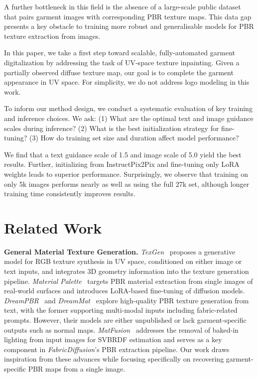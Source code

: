 \documentclass[11pt,twocolumn]{article}
\begin{document}
A further bottleneck in this field is the absence of a large-scale public dataset that pairs garment images with corresponding PBR texture maps. This data gap presents a key obstacle to training more robust and generalisable models for PBR texture extraction from images.

In this paper, we take a first step toward scalable, fully-automated garment digitalization by addressing the task of UV-space texture inpainting. Given a partially observed diffuse texture map, our goal is to complete the garment appearance in UV space. For simplicity, we do not address logo modeling in this work.

To inform our method design, we conduct a systematic evaluation of key training and inference choices. We ask: (1) What are the optimal text and image guidance scales during inference? (2) What is the best initialization strategy for fine-tuning? (3) How do training set size and duration affect model performance?

We find that a text guidance scale of 1.5 and image scale of 5.0 yield the best results. Further, initializing from InstructPix2Pix and fine-tuning only LoRA weights leads to superior performance. Surprisingly, we observe that training on only 5k images performs nearly as well as using the full 27k set, although longer training time consistently improves results.

\section{Related Work}

\textbf{General Material Texture Generation.} \textit{TexGen}~\cite{texgen} proposes a generative model for RGB texture synthesis in UV space, 
conditioned on either image or text inputs, and integrates 3D geometry information into the texture generation pipeline. 
\textit{Material Palette}~\cite{materialpalette} targets PBR material extraction from single images of 
real-world surfaces and introduces LoRA-based fine-tuning of diffusion models. 
\textit{DreamPBR}~\cite{dreampbr} and \textit{DreamMat}~\cite{dreammat} explore high-quality PBR texture generation from text, with the 
former supporting multi-modal inputs including fabric-related prompts. 
However, their models are either unpublished or lack garment-specific outputs such as normal maps. 
\textit{MatFusion}~\cite{matfusion} addresses the removal of baked-in lighting from input images for SVBRDF 
estimation and serves as a key component in \textit{FabricDiffusion}'s PBR extraction pipeline. Our work draws 
inspiration from these advances while focusing specifically on recovering garment-specific PBR maps from a single image.
\end{document}
